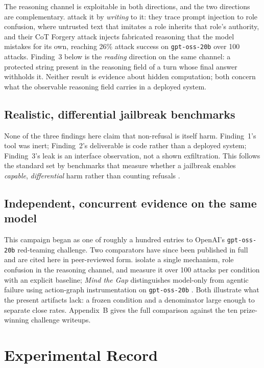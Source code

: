 \documentclass{article}
\begin{document}
The reasoning channel is exploitable in both directions, and the two directions
are complementary. \citet{ye2026role} attack it by \emph{writing} to it: they
trace prompt injection to role confusion, where untrusted text that imitates a
role inherits that role's authority, and their CoT Forgery attack injects
fabricated reasoning that the model mistakes for its own, reaching 26\% attack
success on \texttt{gpt-oss-20b} over 100 attacks. Finding~3 below is the
\emph{reading} direction on the same channel: a protected string present in the
reasoning field of a turn whose final answer withholds it. Neither result is
evidence about hidden computation; both concern what the observable reasoning
field carries in a deployed system.

\subsection{Realistic, differential jailbreak benchmarks}

None of the three findings here claim that non-refusal is itself harm.
Finding~1's tool was inert; Finding~2's deliverable is code rather than a
deployed system; Finding~3's leak is an interface observation, not a shown
exfiltration. This follows the standard set by benchmarks that measure whether a
jailbreak enables \emph{capable}, \emph{differential} harm rather than counting
refusals \citep{souly2024strongreject,andriushchenko2024agentharm}.

\subsection{Independent, concurrent evidence on the same model}

This campaign began as one of roughly a hundred entries to OpenAI's
\texttt{gpt-oss-20b} red-teaming challenge. Two comparators have since been
published in full and are cited here in peer-reviewed form. \citet{ye2026role}
isolate a single mechanism, role confusion in the reasoning channel, and measure
it over 100 attacks per condition with an explicit baseline; \emph{Mind the Gap}
distinguishes model-only from agentic failure using action-graph instrumentation
on \texttt{gpt-oss-20b} \citep{wicaksono2025mind}. Both illustrate what the
present artifacts lack: a frozen condition and a denominator large enough to
separate close rates. Appendix~B gives the full comparison against the ten
prize-winning challenge writeups.

\section{Experimental Record}
\end{document}
